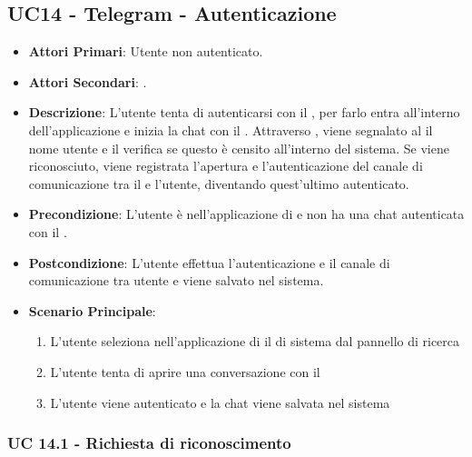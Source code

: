 \subsection{UC14 - Telegram - Autenticazione}
		
		
	\begin{itemize}
		\item \textbf{Attori Primari}: Utente non autenticato.
		\item \textbf{Attori Secondari}: .
		\item \textbf{Descrizione}: L'utente tenta di autenticarsi con il  , per farlo entra all'interno dell'applicazione e inizia la chat con il . Attraverso , viene segnalato al  il nome utente e il  verifica se questo è censito all'interno del sistema. Se viene riconosciuto, viene registrata l'apertura e l'autenticazione del canale di comunicazione tra il  e l'utente, diventando quest'ultimo autenticato. 
		\item \textbf{Precondizione}: L'utente è nell'applicazione di  e non ha una chat autenticata con il .
		\item \textbf{Postcondizione}: L'utente effettua l'autenticazione e il canale di comunicazione tra utente e  viene salvato nel sistema.
		\item \textbf{Scenario Principale}:
		\begin{enumerate}
			\item L'utente seleziona nell'applicazione di  il  di sistema dal pannello di ricerca
			\item L'utente tenta di aprire una conversazione con il 
			\item L'utente viene autenticato e la chat viene salvata nel sistema
		\end{enumerate}
	\end{itemize}
	
	\subsubsection{UC 14.1 - Richiesta di riconoscimento}

